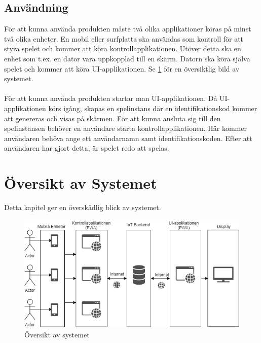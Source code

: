 \documentclass[10pt]{article}
\begin{document}
	\subsection{Användning}
		För att kunna använda produkten måste två olika applikationer köras på minst två olika enheter. En mobil eller surfplatta ska användas som kontroll för att styra spelet och kommer att köra kontrollapplikationen. Utöver detta ska en enhet som t.ex. en dator vara uppkopplad till en skärm. Datorn ska köra själva spelet och kommer att köra UI-applikationen. Se \ref{fig:overview} för en översiktlig bild av systemet. \\
\\
För att kunna använda produkten startar man UI-applikationen. Då UI-applikationen körs igång, skapas en spelinstans där en identifikationskod kommer att genereras och visas på skärmen. För att kunna ansluta sig till den spelinstansen behöver en användare starta kontrollapplikationen. Här kommer användaren behöva ange ett användarnamn samt identifikationskoden. Efter att användaren har gjort detta, är spelet redo att spelas.

\pagebreak

\section{Översikt av Systemet}
	Detta kapitel ger en överskådlig blick av systemet.
	
	\begin{figure}[h]
		\centering
		\includegraphics[scale=0.8]{overview}
		\caption{Översikt av systemet}
		\label{fig:overview}
	\end{figure}
\end{document}
